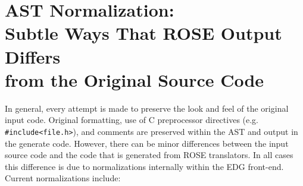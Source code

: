 \section{AST Normalization: \\ Subtle Ways That ROSE Output Differs \\ from the Original Source Code}

   In general, every attempt is made to preserve the look and feel of the original input
code.  Original formatting, use of C preprocessor directives 
(e.g. {\tt \#include<file.h>}), and comments are preserved within the AST and output 
in the generate code.   However, there can be minor differences between the input 
source code and the code that is generated from ROSE translators. In all cases this 
difference is due to normalizations internally within the EDG front-end.  Current 
normalizations include:

